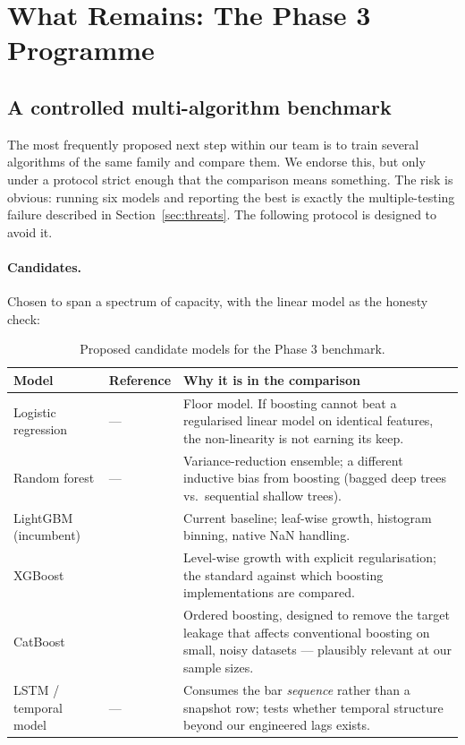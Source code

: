 \documentclass[11pt,a4paper]{article}
\begin{document}
\section{What Remains: The Phase 3 Programme}\label{sec:future}

\subsection{A controlled multi-algorithm benchmark}\label{sec:benchmark}

The most frequently proposed next step within our team is to train several algorithms of
the same family and compare them. We endorse this, but only under a protocol strict
enough that the comparison means something. The risk is obvious: running six models and
reporting the best is exactly the multiple-testing failure described in
Section~\ref{sec:threats}. The following protocol is designed to avoid it.

\paragraph{Candidates.} Chosen to span a spectrum of capacity, with the linear model as
the honesty check:
\begin{table}[H]
\centering\small
\begin{tabular}{@{}llp{6.6cm}@{}}
\toprule
\textbf{Model} & \textbf{Reference} & \textbf{Why it is in the comparison}\\
\midrule
Logistic regression & --- & Floor model. If boosting cannot beat a regularised linear
model on identical features, the non-linearity is not earning its keep.\\
Random forest & --- & Variance-reduction ensemble; a different inductive bias from
boosting (bagged deep trees vs.\ sequential shallow trees).\\
LightGBM (incumbent) & \cite{lightgbm} & Current baseline; leaf-wise growth, histogram
binning, native NaN handling.\\
XGBoost & \cite{xgboost} & Level-wise growth with explicit regularisation; the standard
against which boosting implementations are compared.\\
CatBoost & \cite{catboost} & Ordered boosting, designed to remove the target leakage that
affects conventional boosting on small, noisy datasets --- plausibly relevant at our
sample sizes.\\
LSTM / temporal model & --- & Consumes the bar \emph{sequence} rather than a
snapshot row; tests whether temporal structure beyond our engineered lags exists.\\
\bottomrule
\end{tabular}
\caption{Proposed candidate models for the Phase 3 benchmark.}
\label{tab:candidates}
\end{table}
\end{document}
